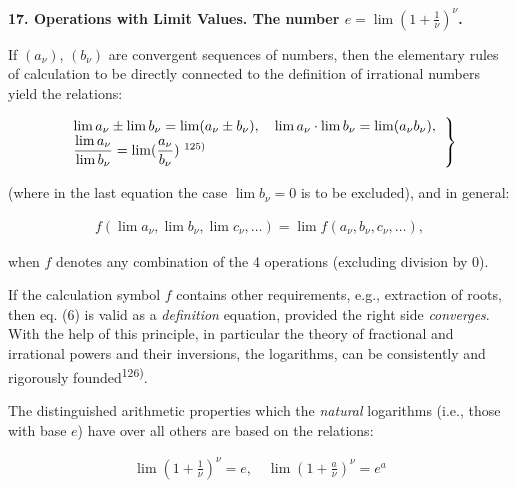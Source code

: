 \thispagestyle{fancy}

\vspace{0.5cm}

\textbf{17. Operations with Limit Values. The number $e = \lim (1 + \frac{1}{\nu})^\nu$.}

If $(a_\nu)$, $(b_\nu)$ are convergent sequences of numbers, then the elementary rules of calculation to be directly connected to the definition of irrational numbers yield the relations:

\vspace{-0.5cm}
\begin{align}
    \left.\begin{tabular}{l}
    $\lim a_\nu \pm \lim b_\nu = \lim (a_\nu \pm b_\nu), \quad \lim a_\nu \cdot \lim b_\nu = \lim (a_\nu b_\nu),$ \\
    $\displaystyle\frac{\lim a_\nu}{\lim b_\nu} = \lim (\frac{a_\nu}{b_\nu})$ \textsuperscript{125)}
    \end{tabular}\right\}
\end{align}


(where in the last equation the case $\lim b_\nu = 0$ is to be excluded), and in general:

\vspace{-0.5cm}
\begin{align}
f(\lim a_\nu, \lim b_\nu, \lim c_\nu, \ldots) = \lim f(a_\nu, b_\nu, c_\nu, \ldots),
\end{align}

when $f$ denotes any combination of the 4 operations (excluding division by 0).

If the calculation symbol $f$ contains other requirements, e.g., extraction of roots, then eq. (6) is valid as a \textit{definition} equation, provided the right side \textit{converges}. With the help of this principle, in particular the theory of fractional and irrational powers and their inversions, the logarithms, can be consistently and rigorously founded\textsuperscript{126)}.

The distinguished arithmetic properties which the \textit{natural} logarithms (i.e., those with base $e$) have over all others are based on the relations:

\vspace{-0.5cm}
\begin{align}
\lim (1 + \frac{1}{\nu})^\nu = e, \quad \lim (1 + \frac{a}{\nu})^\nu = e^a
\end{align}

